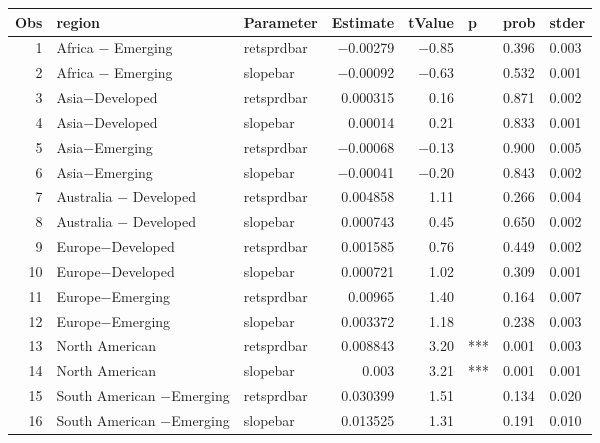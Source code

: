 

\begin{longtable}{|r|l|l|r|r|l|l|l|}\hline
   Obs &    region &    Parameter &    Estimate &    tValue &    p &    prob &    stder\\\hline
\endhead
   1 &    Africa $-$ Emerging &    retsprdbar &    $-$0.00279 &    $-$0.85 &      &    0.396 &    0.003\\\hline
   2 &    Africa $-$ Emerging &    slopebar &    $-$0.00092 &    $-$0.63 &      &    0.532 &    0.001\\\hline
   3 &    Asia$-$Developed &    retsprdbar &    0.000315 &    0.16 &      &    0.871 &    0.002\\\hline
   4 &    Asia$-$Developed &    slopebar &    0.00014 &    0.21 &      &    0.833 &    0.001\\\hline
   5 &    Asia$-$Emerging &    retsprdbar &    $-$0.00068 &    $-$0.13 &      &    0.900 &    0.005\\\hline
   6 &    Asia$-$Emerging &    slopebar &    $-$0.00041 &    $-$0.20 &      &    0.843 &    0.002\\\hline
   7 &    Australia $-$ Developed &    retsprdbar &    0.004858 &    1.11 &      &    0.266 &    0.004\\\hline
   8 &    Australia $-$ Developed &    slopebar &    0.000743 &    0.45 &      &    0.650 &    0.002\\\hline
   9 &    Europe$-$Developed &    retsprdbar &    0.001585 &    0.76 &      &    0.449 &    0.002\\\hline
   10 &    Europe$-$Developed &    slopebar &    0.000721 &    1.02 &      &    0.309 &    0.001\\\hline
   11 &    Europe$-$Emerging &    retsprdbar &    0.00965 &    1.40 &      &    0.164 &    0.007\\\hline
   12 &    Europe$-$Emerging &    slopebar &    0.003372 &    1.18 &      &    0.238 &    0.003\\\hline
   13 &    North American &    retsprdbar &    0.008843 &    3.20 &    *** &    0.001 &    0.003\\\hline
   14 &    North American &    slopebar &    0.003 &    3.21 &    *** &    0.001 &    0.001\\\hline
   15 &    South American $-$Emerging &    retsprdbar &    0.030399 &    1.51 &      &    0.134 &    0.020\\\hline
   16 &    South American $-$Emerging &    slopebar &    0.013525 &    1.31 &      &    0.191 &    0.010\\\hline
\end{longtable}

